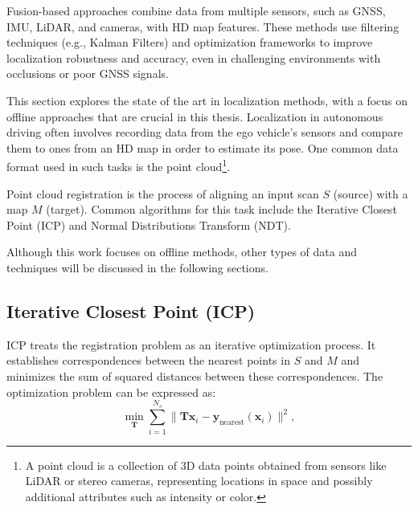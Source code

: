 Fusion-based approaches combine data from multiple sensors, such as GNSS, IMU, LiDAR, and cameras, with HD map features. These methods use filtering techniques (e.g., Kalman Filters) and optimization frameworks to improve localization robustness and accuracy, even in challenging environments with occlusions or poor GNSS signals. 

This section explores the state of the art in localization methods, with a focus on offline approaches that are crucial in this thesis. Localization in autonomous driving often involves recording data from the ego vehicle's sensors and compare them to ones from an HD map in order to estimate its pose. One common data format used in such tasks is the point cloud\footnote{A point cloud is a collection of 3D data points obtained from sensors like LiDAR or stereo cameras, representing locations in space and possibly additional attributes such as intensity or color.}. 

Point cloud registration is the process of aligning an input scan \( S \) (source) with a map \( M \) (target). Common algorithms for this task include the Iterative Closest Point (ICP) and Normal Distributions Transform (NDT). 

Although this work focuses on offline methods, other types of data and techniques will be discussed in the following sections.

\subsection*{Iterative Closest Point (ICP)}
ICP treats the registration problem as an iterative optimization process. It establishes correspondences between the nearest points in \( S \) and \( M \) and minimizes the sum of squared distances between these correspondences. The optimization problem can be expressed as:
\begin{equation}
    \min_{\mathbf{T}} \sum_{i=1}^{N_s} \| \mathbf{T} \mathbf{x}_i - \mathbf{y}_{\text{nearest}}(\mathbf{x}_i) \|^2,
\end{equation}

